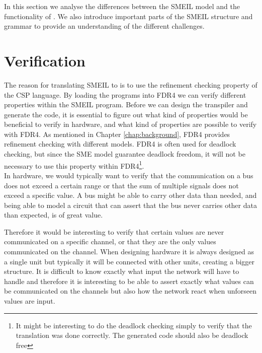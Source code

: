 


In this section we analyse the differences between the SMEIL model and the functionality of \cspm. We also introduce important parts of the SMEIL structure and grammar to provide an understanding of the different challenges.

\section{Verification}
\label{sec:analysis_verification}
The reason for translating SMEIL to \cspm{} is to use the refinement checking property of the CSP language. By loading the \cspm{} programs into FDR4 we can verify different properties within the SMEIL program.
Before we can design the transpiler and generate the \cspm{} code, it is essential to figure out what kind of properties would be beneficial to verify in hardware, and what kind of properties are possible to verify with FDR4.
As mentioned in Chapter \ref{chap:background}, FDR4 provides refinement checking with different models. FDR4 is often used for deadlock checking, but since the SME model guarantee deadlock freedom, it will not be necessary to use this property within FDR4\footnote{It might be interesting to do the deadlock checking simply to verify that the translation was done correctly. The generated \cspm{} code should also be deadlock free}.\\

In hardware, we would typically want to verify that the communication on a bus does not exceed a certain range or that the sum of multiple signals does not exceed a specific value. A bus might be able to carry other data than needed, and being able to model a circuit that can assert that the bus never carries other data than expected, is of great value.

Therefore it would be interesting to verify that certain values are never communicated on a specific channel, or that they are the only values communicated on the channel.
When designing hardware it is always designed as a single unit but typically it will be connected with other units, creating a bigger structure. It is difficult to know exactly what input the network will have to handle and therefore it is interesting to be able to assert exactly what values can be communicated on the channels but also how the network react when unforseen values are input.

